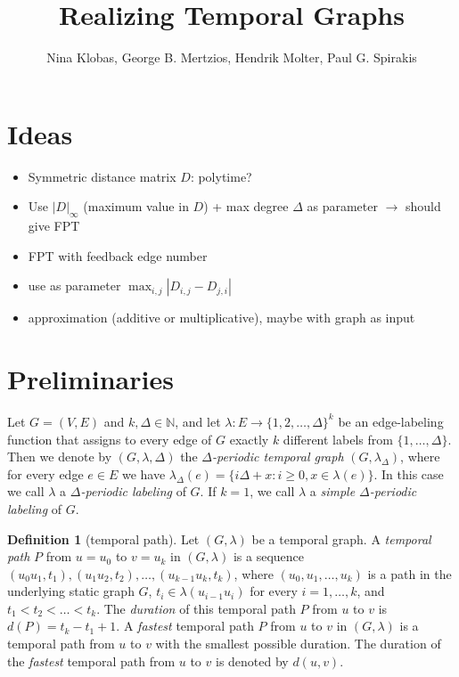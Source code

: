 \documentclass[11pt,a4paper]{article}
\title{Realizing Temporal Graphs}
\author{Nina Klobas, George B. Mertzios, Hendrik Molter, Paul G. Spirakis}
\theoremstyle{remark}
\theoremstyle{definition}
\newtheorem{definition}[theorem]{Definition}
\begin{document}
	\maketitle

\section{Ideas}
\begin{itemize}
    \item Symmetric distance matrix $D$: polytime?
    \item Use $|D|_\infty$ (maximum value in $D$) + max degree $\Delta$ as parameter $\rightarrow$ should give FPT
    \item FPT with feedback edge number
    \item use as parameter $\max_{i,j} |D_{i,j}-D_{j,i}|$
    \item approximation (additive or multiplicative), maybe with graph as input
\end{itemize}

\section{Preliminaries}

Let $G=(V,E)$ and $k,\Delta\in \mathbb{N}$, and let $\lambda: E \rightarrow \{1,2,\ldots,\Delta\}^k$ be an edge-labeling function that assigns to every edge of $G$ exactly $k$ different labels from $\{1,\ldots,\Delta\}$. 
Then we denote by $(G,\lambda,\Delta)$ the \emph{$\Delta$-periodic temporal graph} $(G,\lambda_{\Delta})$, where for every edge $e\in E$ we have $\lambda_{\Delta}(e)=\{i\Delta + x : i\geq 0, x\in \lambda(e)\}$. 
In this case we call $\lambda$ a \emph{$\Delta$-periodic labeling} of $G$. If $k=1$, we call $\lambda$ a \emph{simple $\Delta$-periodic labeling} of $G$.

\begin{definition}[temporal path] \label{def:temporalPath+Duration}
Let $(G,\lambda)$ be a temporal graph. A \emph{temporal path} $P$ from $u=u_0$ to $v=u_k$ in $(G,\lambda)$ is a sequence $(u_0 u_1,t_1),(u_1 u_2,t_2),\ldots,(u_{k-1} u_k,t_k)$, where $(u_0,u_1,\ldots,u_k)$ is a path in the underlying static graph $G$, $t_i\in \lambda(u_{i-1}u_i)$ for every $i=1,\ldots,k$, and $t_1<t_2<\ldots<t_k$. 
The \emph{duration} of this temporal path $P$ from $u$ to $v$ is $d(P)=t_k - t_1 + 1$.
A \emph{fastest} temporal path $P$ from $u$ to $v$ in $(G,\lambda)$ is a temporal path from $u$ to $v$ with the smallest possible duration.
The duration of the \emph{fastest} temporal path from $u$ to $v$ is denoted by $d(u,v)$.
\end{definition}
\end{document}

